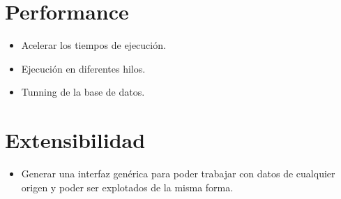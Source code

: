 \section{Performance}
\begin{itemize}
 \item Acelerar los tiempos de ejecución.
 \item Ejecución en diferentes hilos.
 \item Tunning de la base de datos.
\end{itemize}

\section{Extensibilidad}
\begin{itemize}
 \item Generar una interfaz genérica para poder trabajar con datos de cualquier origen y poder ser explotados de la misma forma.
\end{itemize}
